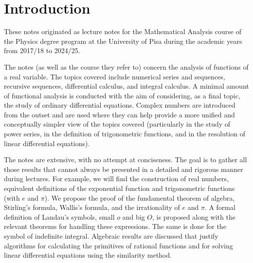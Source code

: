 \chapter*{Introduction}

These notes originated as lecture notes for the Mathematical Analysis course of %
the Physics degree program at the University of Pisa during the academic years %
from 2017/18 to 2024/25. %

The notes (as well as the course they refer to) concern the analysis of %
functions of a real variable. The topics covered include numerical series and %
sequences, recursive sequences, differential calculus, and integral calculus. A %
minimal amount of functional analysis is conducted with the aim of considering, %
as a final topic, the study of ordinary differential equations. Complex numbers %
are introduced from the outset and are used where they can help provide a more %
unified and conceptually simpler view of the topics covered (particularly in the %
study of power series, in the definition of trigonometric functions, and in the %
resolution of linear differential equations). %

The notes are extensive, with no attempt at conciseness. The goal is to gather %
all those results that cannot always be presented in a detailed and rigorous %
manner during lectures. For example, we will find the construction of real %
numbers, equivalent definitions of the exponential function and trigonometric %
functions (with $e$ and $\pi$). We propose the proof of the fundamental theorem %
of algebra, Stirling's formula, Wallis's formula, and the irrationality of $e$ %
and $\pi$. A formal definition of Landau's symbols, small $o$ and big $O$, is %
proposed along with the relevant theorems for handling these expressions. The %
same is done for the symbol of indefinite integral. Algebraic results are %
discussed that justify algorithms for calculating the primitives of rational %
functions and for solving linear differential equations using the similarity %
method. %

